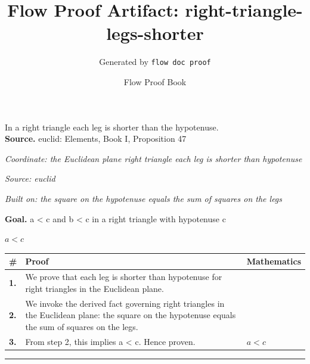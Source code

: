 \documentclass[11pt]{article}
\title{Flow Proof Artifact: right-triangle-legs-shorter}
\author{Generated by \texttt{flow doc proof}}
\date{Flow Proof Book}
\theoremstyle{definition}
\begin{document}
\maketitle
In a right triangle each leg is shorter than the hypotenuse.\\[0.5em]
\textbf{Source.} euclid: Elements, Book I, Proposition 47\\[0.5em]
\bigskip
{}\par
\smallskip\noindent\textit{Coordinate: the Euclidean plane \cdot right triangle \cdot each leg is shorter than hypotenuse}\par
\smallskip\noindent\textit{Source: euclid}\par
\smallskip\noindent\textit{Built on: the square on the hypotenuse equals the sum of squares on the legs}\par
\medskip
\noindent\textbf{Goal.} a < c and b < c in a right triangle with hypotenuse c\par
\noindent$\displaystyle a < c$\par
\medskip
\noindent
\begin{tabular}{@{} >{\raggedright\arraybackslash}p{} >{\raggedright\arraybackslash}p{} >{\raggedleft\arraybackslash}p{} @{}}
\textbf{\#} & \textbf{Proof} & \textbf{Mathematics} \\
\midrule
\textbf{1.} & We prove that each leg is shorter than hypotenuse for right triangles in the Euclidean plane. & \\[0.45em]
\textbf{2.} & We invoke the derived fact governing right triangles in the Euclidean plane: the square on the hypotenuse equals the sum of squares on the legs. & \\[0.45em]
\textbf{3.} & From step 2, this implies a < c. Hence proven. & $\displaystyle a < c$ \\[0.45em]
\bottomrule
\end{tabular}
\label{thm:Geometry-right triangle-each_leg_is_shorter_than_hypotenuse}
\par\medskip\hrule
\end{document}

